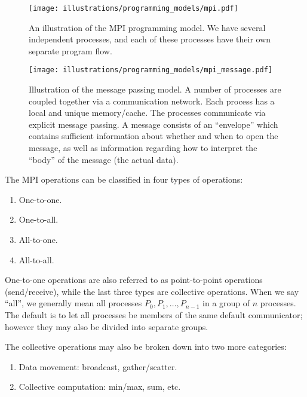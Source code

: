 \begin{figure}[H]
  \centering
  \texttt{[image: illustrations/programming\_models/mpi.pdf]}
  \caption{An illustration of the MPI programming model. We have several independent processes, and each of these processes have their own separate program flow.}
  \label{fig:mpi}
\end{figure}

\begin{figure}[H]
  \centering
  \texttt{[image: illustrations/programming\_models/mpi\_message.pdf]}
  \caption{Illustration of the message passing model. A number of processes are coupled together via a communication network. Each process has a local and unique memory/cache. The processes communicate via explicit message passing. A
message consists of an ``envelope'' which contains sufficient information about whether and when to open the message, as well as information regarding how to interpret the ``body'' of the message (the actual data).}
  \label{fig:message}
\end{figure}

The MPI operations can be classified in four types of operations:
\begin{enumerate}
  \item One-to-one.
  \item One-to-all.
  \item All-to-one.
  \item All-to-all.
\end{enumerate}

One-to-one operations are also referred to as point-to-point operations (send/receive), while the last three types are collective operations. When we say ``all'', we generally mean all processes $P_0, P_1, \dots, P_{n-1}$ in a group of $n$ processes. The default is to let all processes be members of the same default communicator; however they may also be divided into separate groups.

The collective operations may also be broken down into two more categories:
\begin{enumerate}[label=\alph*)]
  \item Data movement: broadcast, gather/scatter.
  \item Collective computation: min/max, sum, etc.
\end{enumerate}


